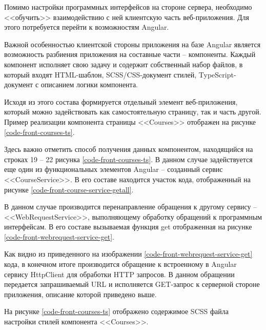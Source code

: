 Помимо настройки программных интерфейсов на стороне сервера, необходимо <<обучить>> взаимодействию с ней клиентскую часть веб-приложения.
Для этого потребуется перейти к возможностям Angular.

Важной особенностью клиентской стороны приложения на базе Angular является возможность разбиения приложения на составные части -- компоненты.
Каждый компонент исполняет свою задачу и содержит собственный набор файлов, в который входят HTML-шаблон, SCSS/CSS-документ стилей, TypeScript-документ с описанием логики компонента.

Исходя из этого состава формируется отдельный элемент веб-приложения, который можно задействовать как самостоятельную страницу, так и часть другой.
Пример реализации компонента страницы <<Courses>> отображен на рисунке \ref{code-front-courses-ts}.


Здесь важно отметить способ получения данных компонентом, находящийся на строках 19 -- 22 рисунка \ref{code-front-courses-ts}.
В данном случае задействуется еще один из функциональных элементов Angular -- созданный сервис <<CourseService>>.
В его составе находится участок кода, отображенный на рисунке \ref{code-front-course-service-getall}.


В данном случае производится перенаправление обращения к другому сервису -- <<WebRequestService>>, выполняющему обработку обращений к программным интерфейсам.
В его составе вызываемая функция get отображенная на рисунке \ref{code-front-webrequest-service-get}.


Как видно из приведенного на изображении \ref{code-front-webrequest-service-get} кода, в конечном итоге производится обращение к встроенному в Angular сервису HttpClient для обработки HTTP запросов.
В данном обращении передается запрашиваемый URL и исполняется GET-запрос к серверной стороне приложения, описание которой приведено выше.

На рисунке \ref{code-front-courses-ts} отображено содержимое SCSS файла настройки стилей компонента <<Courses>>.

